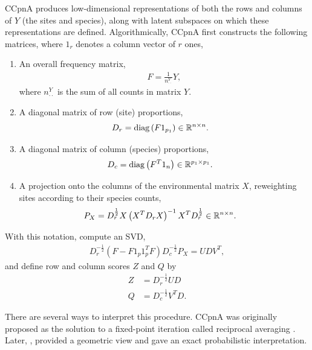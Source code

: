 \documentclass[14pt]{extarticle}
\begin{document}
CCpnA produces low-dimensional representations of both the rows and columns of
$Y$ (the sites and species), along with latent subspaces on which these
representations are defined. Algorithmically, CCpnA first constructs the
following matrices, where $1_{r}$ denotes a column vector of $r$ ones,
\begin{enumerate}
  \item An overall frequency matrix,
    \begin{align*}
      F = \frac{1}{n_{\cdot\cdot}^{Y}} Y,
  \end{align*}
  where $n_{\cdot\cdot}^{Y}$ is the sum of all counts in matrix
  $Y$.
\item A diagonal matrix of row (site) proportions,
  \begin{align*}
    D_{r} &= \mathop\mathrm{diag}\left(F 1_{p_{1}}\right) \in \mathbb{R}^{n \times n}.
  \end{align*}
\item A diagonal matrix of column (species) proportions,
  \begin{align*}
    D_{c} &= \mathop\mathrm{diag}\left(F^{T}1_{n}\right) \in \mathbb{R}^{p_{1} \times p_{1}}.
  \end{align*}
\item A projection onto the columns of the environmental matrix
  $X$, reweighting sites according to their species counts,
  \begin{align*}
    P_{X} &= D_{r}^{\frac{1}{2}}X\left(X^{T}D_{r}X\right)^{-1}X^{T}D_{r}^{\frac{1}{2}} \in
  \mathbb{R}^{n \times n}.
\end{align*}
\end{enumerate}

With this notation, compute an SVD,
\begin{align*}
D_{r}^{-\frac{1}{2}}\left(F - F 1_{p}1_{p}^{T}F\right)D_{c}^{-\frac{1}{2}}P_{X}
= UDV^{T},
\end{align*}
and define row and column scores $Z$ and $Q$ by
\begin{align*}
  Z &= D_{r}^{-\frac{1}{2}} UD \\
  Q &= D_{c}^{-\frac{1}{2}}V^{T}D.
\end{align*}

There are several ways to interpret this procedure. CCpnA was originally
proposed as the solution to a fixed-point iteration called reciprocal averaging
\citep{ter1986canonical}. Later, \cite{greenacre1987geometric,
  greenacre1984theory}, provided a geometric view and \cite{zhu2005constrained}
gave an exact probabilistic interpretation.
\end{document}
